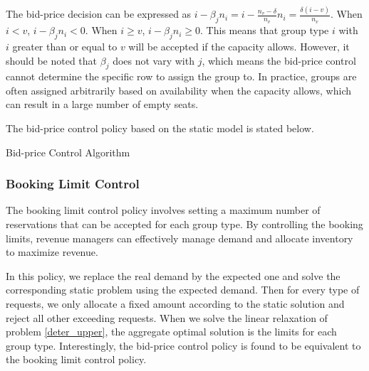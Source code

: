 The bid-price decision can be expressed as $i - \beta_j n_i = i - \frac{n_v - \delta}{n_v} n_i = \frac{\delta (i - v)}{n_v}$. When $i < v$, $i - \beta_j n_i < 0$. When $i \geq v$, $i - \beta_j n_i \geq 0$. This means that group type $i$ with $i$ greater than or equal to $v$ will be accepted if the capacity allows. However, it should be noted that $\beta_j$ does not vary with $j$, which means the bid-price control cannot determine the specific row to assign the group to. In practice, groups are often assigned arbitrarily based on availability when the capacity allows, which can result in a large number of empty seats.

The bid-price control policy based on the static model is stated below.

\begin{algorithm}[H]
  \caption{Bid-price Control Algorithm}\label{algo_bid}
\end{algorithm}


\subsubsection*{Booking Limit Control}

The booking limit control policy involves setting a maximum number of reservations that can be accepted for each group type. By controlling the booking limits, revenue managers can effectively manage demand and allocate inventory to maximize revenue.

In this policy, we replace the real demand by the expected one and solve the corresponding static problem using the expected demand. Then for every type of requests, we only allocate a fixed amount according to the static solution and reject all other exceeding requests. When we solve the linear relaxation of problem \eqref{deter_upper}, the aggregate optimal solution is the limits for each group type. Interestingly, the bid-price control policy is found to be equivalent to the booking limit control policy.


